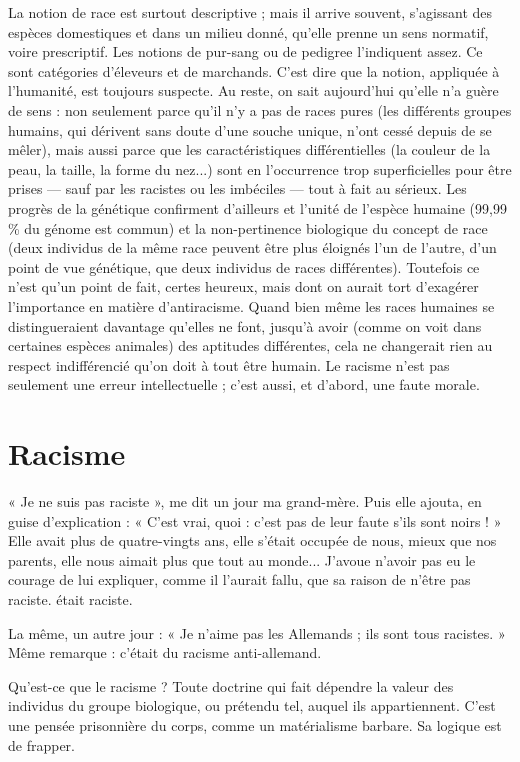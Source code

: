 La notion de race est surtout descriptive ; mais il arrive souvent, s'agissant
des espèces domestiques et dans un milieu donné, qu’elle prenne un sens normatif,
voire prescriptif. Les notions de pur-sang ou de pedigree l’indiquent
assez. Ce sont catégories d’éleveurs et de marchands. C’est dire que la notion,
appliquée à l'humanité, est toujours suspecte. Au reste, on sait aujourd’hui
qu’elle n’a guère de sens : non seulement parce qu’il n’y a pas de races pures (les
différents groupes humains, qui dérivent sans doute d’une souche unique,
n'ont cessé depuis de se mêler), mais aussi parce que les caractéristiques différentielles
(la couleur de la peau, la taille, la forme du nez...) sont en l’occurrence
trop superficielles pour être prises — sauf par les racistes ou les imbéciles
— tout à fait au sérieux. Les progrès de la génétique confirment d’ailleurs et
l'unité de l’espèce humaine (99,99 \% du génome est commun) et la non-pertinence
biologique du concept de race (deux individus de la même race peuvent
être plus éloignés l’un de l’autre, d’un point de vue génétique, que deux individus
de races différentes). Toutefois ce n’est qu'un point de fait, certes heureux,
mais dont on aurait tort d’exagérer l'importance en matière d’antiracisme.
Quand bien même les races humaines se distingueraient davantage
qu'elles ne font, jusqu’à avoir (comme on voit dans certaines espèces animales)
des aptitudes différentes, cela ne changerait rien au respect indifférencié qu’on
doit à tout être humain. Le racisme n’est pas seulement une erreur
intellectuelle ; c’est aussi, et d’abord, une faute morale.

\section{Racisme}
« Je ne suis pas raciste », me dit un jour ma grand-mère. Puis elle
ajouta, en guise d’explication : « C’est vrai, quoi : c’est pas de leur
faute s’ils sont noirs ! » Elle avait plus de quatre-vingts ans, elle s'était occupée
de nous, mieux que nos parents, elle nous aimait plus que tout au monde...
J'avoue n’avoir pas eu le courage de lui expliquer, comme il l'aurait fallu, que
sa raison de n’être pas raciste. était raciste.

La même, un autre jour : « Je n’aime pas les Allemands ; ils sont tous
racistes. » Même remarque : c'était du racisme anti-allemand.

Qu'est-ce que le racisme ? Toute doctrine qui fait dépendre la valeur des
individus du groupe biologique, ou prétendu tel, auquel ils appartiennent.
C’est une pensée prisonnière du corps, comme un matérialisme barbare. Sa
logique est de frapper.

